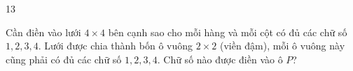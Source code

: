 \begin{probbox}{13}{\relax}
\begin{minipage}[t]{0.62\linewidth}
Cần điền vào lưới $4\times 4$ bên cạnh sao cho mỗi hàng và mỗi cột có đủ các chữ số $1, 2, 3, 4$. Lưới được chia thành bốn ô vuông
$2\times 2$ (viền đậm), mỗi ô vuông này cũng phải có đủ các chữ số $1, 2, 3, 4$. Chữ số nào được điền vào ô $P$?
\end{minipage}\hfill
\begin{minipage}[t]{0.33\linewidth}\vspace{4pt}\centering
{}
\end{minipage}
\end{probbox}
